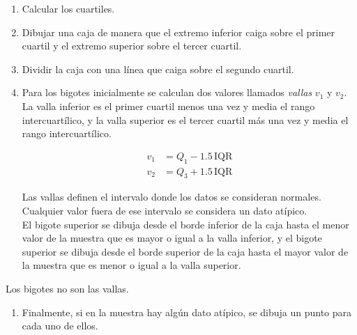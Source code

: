 \documentclass[
  spanish,
  a4paper,
]{scrreport}
\providecommand{\tightlist}{%
  \setlength{\itemsep}{0pt}\setlength{\parskip}{0pt}}
\theoremstyle{plain}
\theoremstyle{definition}
\theoremstyle{definition}
\theoremstyle{remark}
\begin{document}
\begin{enumerate}
\def\labelenumi{\arabic{enumi}.}
\item
  Calcular los cuartiles.
\item
  Dibujar una caja de manera que el extremo inferior caiga sobre el
  primer cuartil y el extremo superior sobre el tercer cuartil.
\item
  Dividir la caja con una línea que caiga sobre el segundo cuartil.
\item
  Para los bigotes inicialmente se calculan dos valores llamados
  \emph{vallas} \(v_1\) y \(v_2\). La valla inferior es el primer
  cuartil menos una vez y media el rango intercuartílico, y la valla
  superior es el tercer cuartil más una vez y media el rango
  intercuartílico.

  \[
   \begin{aligned}
   v_1&=Q_1-1.5\,\text{IQR}\\
   v_2&=Q_3+1.5\,\text{IQR}
   \end{aligned}
   \]

  Las vallas definen el intervalo donde los datos se consideran
  normales. Cualquier valor fuera de ese intervalo se considera un dato
  atípico.\\
  El bigote superior se dibuja desde el borde inferior de la caja hasta
  el menor valor de la muestra que es mayor o igual a la valla inferior,
  y el bigote superior se dibuja desde el borde superior de la caja
  hasta el mayor valor de la muestra que es menor o igual a la valla
  superior.
\end{enumerate}

\begin{tcolorbox}[enhanced jigsaw, arc=.35mm, bottomrule=.15mm, bottomtitle=1mm, breakable, colback=white, colbacktitle=quarto-callout-warning-color!10!white, colframe=quarto-callout-warning-color-frame, coltitle=black, left=2mm, leftrule=.75mm, opacityback=0, opacitybacktitle=0.6, rightrule=.15mm, title=\textcolor{quarto-callout-warning-color}{\faExclamationTriangle}\hspace{0.5em}{Advertencia}, titlerule=0mm, toprule=.15mm, toptitle=1mm]

Los bigotes no son las vallas.

\end{tcolorbox}

\begin{enumerate}
\def\labelenumi{\arabic{enumi}.}
\setcounter{enumi}{4}
\tightlist
\item
  Finalmente, si en la muestra hay algún dato atípico, se dibuja un
  punto para cada uno de ellos.
\end{enumerate}
\end{document}
